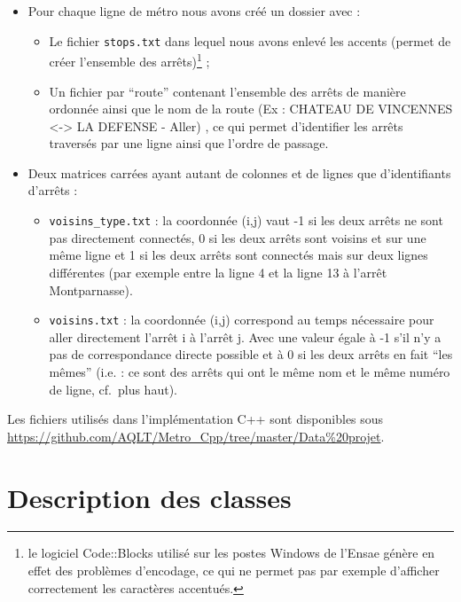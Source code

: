 \documentclass[,french]{article}
\let\rmarkdownfootnote\footnote%
\def\footnote{\protect\rmarkdownfootnote}
\begin{document}
\begin{itemize}
\item
  Pour chaque ligne de métro nous avons créé un dossier avec :

  \begin{itemize}
  \item
    Le fichier \texttt{stops.txt} dans lequel nous avons enlevé les
    accents (permet de créer l'ensemble des arrêts)\footnote{le logiciel
      Code::Blocks utilisé sur les postes Windows de l'Ensae génère en
      effet des problèmes d'encodage, ce qui ne permet pas par exemple
      d'afficher correctement les caractères accentués.} ;
  \item
    Un fichier par ``route'' contenant l'ensemble des arrêts de manière
    ordonnée ainsi que le nom de la route (Ex : CHATEAU DE VINCENNES
    \textless{}-\textgreater{} LA DEFENSE - Aller) , ce qui permet
    d'identifier les arrêts traversés par une ligne ainsi que l'ordre de
    passage.
  \end{itemize}
\item
  Deux matrices carrées ayant autant de colonnes et de lignes que
  d'identifiants d'arrêts :

  \begin{itemize}
  \item
    \texttt{voisins\_type.txt} : la coordonnée (i,j) vaut -1 si les deux
    arrêts ne sont pas directement connectés, 0 si les deux arrêts sont
    voisins et sur une même ligne et 1 si les deux arrêts sont connectés
    mais sur deux lignes différentes (par exemple entre la ligne 4 et la
    ligne 13 à l'arrêt Montparnasse).
  \item
    \texttt{voisins.txt} : la coordonnée (i,j) correspond au temps
    nécessaire pour aller directement l'arrêt i à l'arrêt j. Avec une
    valeur égale à -1 s'il n'y a pas de correspondance directe possible
    et à 0 si les deux arrêts en fait ``les mêmes'' (i.e. : ce sont des
    arrêts qui ont le même nom et le même numéro de ligne, cf.~plus
    haut).
  \end{itemize}
\end{itemize}

Les fichiers utilisés dans l'implémentation C++ sont disponibles sous
\url{https://github.com/AQLT/Metro_Cpp/tree/master/Data\%20projet}.

\hypertarget{sec:desc_classes}{%
\section{Description des classes}\label{sec:desc_classes}}
\end{document}
